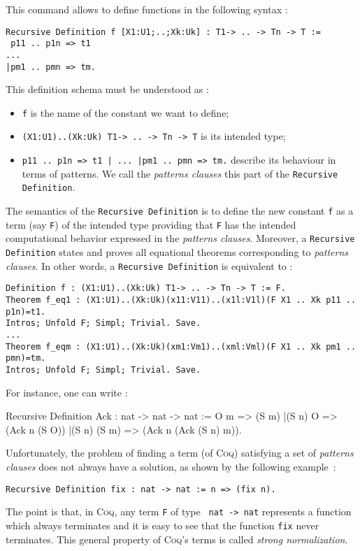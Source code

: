 

\newcommand{\xx}{\noindent}
\newcommand{\Coq}{\textsc{Coq}}




This command allows to define functions in
the following syntax :
\begin{verbatim}
Recursive Definition f [X1:U1;..;Xk:Uk] : T1-> .. -> Tn -> T :=
 p11 .. p1n => t1
...
|pm1 .. pmn => tm.
\end{verbatim}
This definition schema must be understood as :
\begin{itemize}
\item {\tt f} is the name of the constant we want
to define;
\item {\tt (X1:U1)..(Xk:Uk) T1-> .. -> Tn -> T}
is its intended type;
\item {\tt  p11 .. p1n => t1 | ... |pm1 .. pmn => tm.}
describe its beha\-viour in terms of patterns.
We
call the {\sl patterns clauses} this part of the {\tt Recursive Definition}.
\end{itemize}
The semantics of the {\tt Recursive Definition} 
is to
define the new constant {\tt f} as a term (say {\tt F}) of
the intended type providing that {\tt F} has the intended
computational behavior expressed in the {\sl patterns
clauses}. Moreover, a {\tt Recursive Definition} states and
proves all equational theorems corresponding to {\sl
patterns clauses}. In other words, a {\tt Recursive Definition} is
equivalent to :
\begin{verbatim}
Definition f : (X1:U1)..(Xk:Uk) T1-> .. -> Tn -> T := F.
Theorem f_eq1 : (X1:U1)..(Xk:Uk)(x11:V11)..(x1l:V1l)(F X1 .. Xk p11 .. p1n)=t1.
Intros; Unfold F; Simpl; Trivial. Save.
...
Theorem f_eqm : (X1:U1)..(Xk:Uk)(xm1:Vm1)..(xml:Vml)(F X1 .. Xk pm1 .. pmn)=tm.
Intros; Unfold F; Simpl; Trivial. Save.
\end{verbatim}
For instance, one can write :
\begin{coq_example}
Recursive Definition Ack : nat -> nat -> nat :=
  O m => (S m)
 |(S n) O => (Ack n (S O))
 |(S n) (S m) => (Ack n (Ack (S n) m)).
\end{coq_example}

Unfortunately, the problem of finding a term (of \Coq)
satisfying a set of {\sl patterns clauses} does not always have a
solution, as shown by the following example~:\\
\centerline {\tt Recursive Definition fix :
nat -> nat := n => (fix n).} 
The point is that, in \Coq, any term {\tt F} of type {\tt
nat -> nat} represents a function which always terminates
and it is easy to see that the function {\tt fix} never
terminates. This general property of \Coq's terms is called
{\it strong normalization}.

